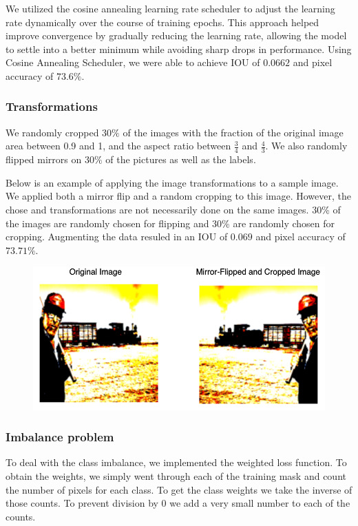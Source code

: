 \documentclass{article}
\begin{document}
We utilized the cosine annealing learning rate scheduler to adjust the learning rate dynamically over the course of training epochs. This approach helped improve convergence by gradually reducing the learning rate, allowing the model to settle into a better minimum while avoiding sharp drops in performance. Using Cosine Annealing Scheduler, we were able to achieve IOU of $0.0662$ and pixel accuracy of $73.6\%$.

\subsubsection{Transformations} 
We randomly cropped $30\%$ of the images with the fraction of the original image area between 0.9 and 1, and the aspect ratio between $\frac{3}{4}$ and $\frac{4}{3}$. We also randomly flipped mirrors on $30\%$ of the pictures as well as the labels.

Below is an example of applying the image transformations to a sample image. We applied both a mirror flip and a random cropping to this image. However, the chose and transformations are not necessarily done on the same images. 30\% of the images are randomly chosen for flipping and 30\% are randomly chosen for cropping. Augmenting the data resuled in an IOU of $0.069$ and pixel accuracy of $73.71\%$.

\begin{figure}[H]
    \centering
    \includegraphics[width=0.8\linewidth]{augmentations_example.png}
\end{figure}

\subsubsection{Imbalance problem} 
 To deal with the class imbalance, we implemented the weighted loss function. To obtain the weights, we simply went through each of the training mask and count the number of pixels for each class. To get the class weights we take the inverse of those counts. To prevent division by 0 we add a very small number to each of the counts.
\end{document}

